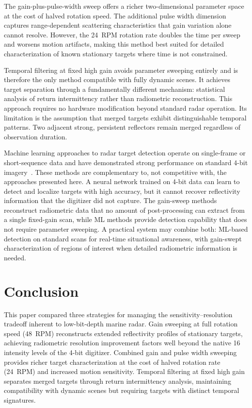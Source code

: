 \documentclass[colorlinks,upint,balance]{asmeconf}
\begin{document}
The gain-plus-pulse-width sweep offers a richer two-dimensional parameter space at the cost of halved rotation speed. The additional pulse width dimension captures range-dependent scattering characteristics that gain variation alone cannot resolve. However, the 24~RPM rotation rate doubles the time per sweep and worsens motion artifacts, making this method best suited for detailed characterization of known stationary targets where time is not constrained.

Temporal filtering at fixed high gain avoids parameter sweeping entirely and is therefore the only method compatible with fully dynamic scenes. It achieves target separation through a fundamentally different mechanism: statistical analysis of return intermittency rather than radiometric reconstruction. This approach requires no hardware modification beyond standard radar operation. Its limitation is the assumption that merged targets exhibit distinguishable temporal patterns. Two adjacent strong, persistent reflectors remain merged regardless of observation duration.

Machine learning approaches to radar target detection operate on single-frame or short-sequence data and have demonstrated strong performance on standard 4-bit imagery~\cite{Baird2020CNNLSTM, Wang2023SALALSTM, Chen2021PPInet}. These methods are complementary to, not competitive with, the approaches presented here. A neural network trained on 4-bit data can learn to detect and localize targets with high accuracy, but it cannot recover reflectivity information that the digitizer did not capture. The gain-sweep methods reconstruct radiometric data that no amount of post-processing can extract from a single fixed-gain scan, while ML methods provide detection capability that does not require parameter sweeping. A practical system may combine both: ML-based detection on standard scans for real-time situational awareness, with gain-swept characterization of regions of interest when detailed radiometric information is needed.


\section{Conclusion}

This paper compared three strategies for managing the sensitivity--resolution tradeoff inherent to low-bit-depth marine radar. Gain sweeping at full rotation speed (48~RPM) reconstructs extended reflectivity profiles of stationary targets, achieving radiometric resolution improvement factors well beyond the native 16 intensity levels of the 4-bit digitizer. Combined gain and pulse width sweeping provides richer target characterization at the cost of halved rotation rate (24~RPM) and increased motion sensitivity. Temporal filtering at fixed high gain separates merged targets through return intermittency analysis, maintaining compatibility with dynamic scenes but requiring targets with distinct temporal signatures.
\end{document}
